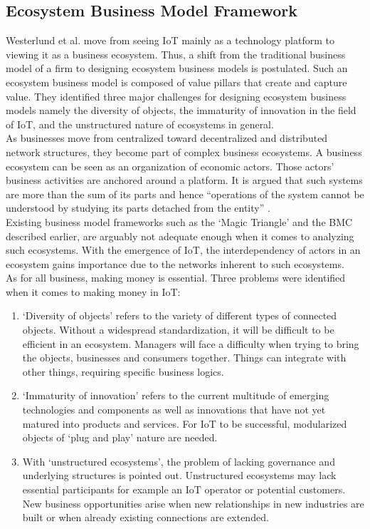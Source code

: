 	\subsection{Ecosystem Business Model Framework}
	\vspace{-1em}
		Westerlund et al. \cite{westerlund} move from seeing IoT mainly as a technology platform to viewing it as a business ecosystem. Thus, a shift from the traditional business model of a firm to designing ecosystem business models is postulated. Such an ecosystem business model is composed of value pillars that create and capture value. They identified three major challenges for designing ecosystem business models namely the diversity of objects, the immaturity of innovation in the field of IoT, and the unstructured nature of ecosystems in general.\\
		As businesses move from centralized toward decentralized and distributed network structures, they become part of complex business ecosystems. A business ecosystem can be seen as an organization of economic actors. Those actors' business activities are anchored around a platform. It is argued that such systems are more than the sum of its parts and hence ``operations of the system cannot be understood by studying its parts detached from the entity'' \cite{westerlund}.\\
		Existing business model frameworks such as the `Magic Triangle' and the BMC described earlier, are arguably not adequate enough when it comes to analyzing such ecosystems. With the emergence of IoT, the interdependency of actors in an ecosystem gains importance due to the networks inherent to such ecosystems.\\
		As for all business, making money is essential. Three problems were identified when it comes to making money in IoT:\\
		\vspace{-1em}
		\begin{enumerate}
			\item `Diversity of objects' refers to the variety of different types of connected objects. Without a widespread standardization, it will be difficult to be efficient in an ecosystem. Managers will face a difficulty when trying to bring the objects, businesses and consumers together. Things can integrate with other things, requiring specific business logics.

			\item `Immaturity of innovation' refers to the current multitude of emerging technologies and components as well as innovations that have not yet matured into products and services. For IoT to be successful, modularized objects of `plug and play' nature are needed.

			\item With `unstructured ecosystems', the problem of lacking governance and underlying structures is pointed out. Unstructured ecosystems may lack essential participants for example an IoT operator or potential customers. New business opportunities arise when new relationships in new industries are built or when already existing connections are extended.
		\end{enumerate}
